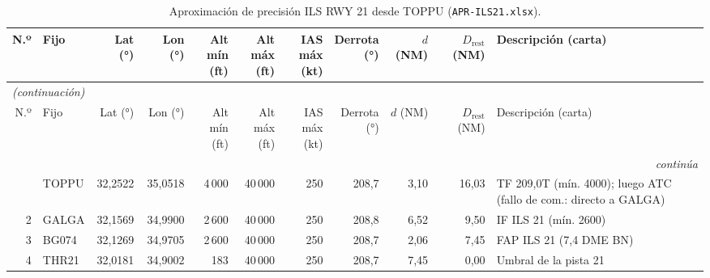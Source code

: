 \begingroup\scriptsize\setlength{\tabcolsep}{2.8pt}
\begin{longtable}{rlrrrrrrrr>{\raggedright\arraybackslash}p{3.4cm}}
\caption{Aproximación de precisión ILS RWY 21 desde TOPPU (\texttt{APR-ILS21.xlsx}).}\label{tab:ils}\\
\toprule
N.º & Fijo & Lat (°) & Lon (°) & \makecell{Alt mín\\(ft)} & \makecell{Alt máx\\(ft)} & \makecell{IAS máx\\(kt)} & \makecell{Derrota\\(°)} & \makecell{$d$\\(NM)} & \makecell{$D_{\mathrm{rest}}$\\(NM)} & Descripción (carta)\\
\midrule
\endfirsthead
\multicolumn{11}{l}{\small\itshape (continuación)}\\
\toprule
N.º & Fijo & Lat (°) & Lon (°) & \makecell{Alt mín\\(ft)} & \makecell{Alt máx\\(ft)} & \makecell{IAS máx\\(kt)} & \makecell{Derrota\\(°)} & \makecell{$d$\\(NM)} & \makecell{$D_{\mathrm{rest}}$\\(NM)} & Descripción (carta)\\
\midrule
\endhead
\midrule
\multicolumn{11}{r}{\small\itshape continúa}\\
\endfoot
\bottomrule
\endlastfoot
1 & TOPPU & 32,2522 & 35,0518 & 4\,000 & 40\,000 & 250 & 208,7 & 3,10 & 16,03 & \scriptsize TF 209,0T (mín. 4000); luego ATC (fallo de com.: directo a GALGA)\\
2 & GALGA & 32,1569 & 34,9900 & 2\,600 & 40\,000 & 250 & 208,8 & 6,52 & 9,50 & \scriptsize IF ILS 21 (mín. 2600)\\
3 & BG074 & 32,1269 & 34,9705 & 2\,600 & 40\,000 & 250 & 208,7 & 2,06 & 7,45 & \scriptsize FAP ILS 21 (7,4 DME BN)\\
4 & THR21 & 32,0181 & 34,9002 & 183 & 40\,000 & 250 & 208,7 & 7,45 & 0,00 & \scriptsize Umbral de la pista 21\\
\end{longtable}
\endgroup
